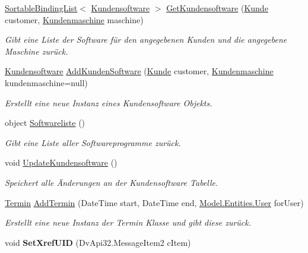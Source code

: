 \begin{DoxyCompactItemize}
\hyperlink{class_products_1_1_common_1_1_sortable_binding_list}{Sortable\+Binding\+List}$<$ \hyperlink{class_products_1_1_model_1_1_entities_1_1_kundensoftware}{Kundensoftware} $>$ \hyperlink{class_products_1_1_model_1_1_model_service_a25aa9ffb4a1196ceb47a65fe08ec54d2}{Get\+Kundensoftware} (\hyperlink{class_products_1_1_model_1_1_entities_1_1_kunde}{Kunde} customer, \hyperlink{class_products_1_1_model_1_1_entities_1_1_kundenmaschine}{Kundenmaschine} maschine)
\begin{DoxyCompactList}\small\item\em Gibt eine Liste der Software für den angegebenen Kunden und die angegebene Maschine zurück. \end{DoxyCompactList}\item 
\hyperlink{class_products_1_1_model_1_1_entities_1_1_kundensoftware}{Kundensoftware} \hyperlink{class_products_1_1_model_1_1_model_service_aecc875dd0da85f7a63bbb60f2fa423a5}{Add\+Kunden\+Software} (\hyperlink{class_products_1_1_model_1_1_entities_1_1_kunde}{Kunde} customer, \hyperlink{class_products_1_1_model_1_1_entities_1_1_kundenmaschine}{Kundenmaschine} kundenmaschine=null)
\begin{DoxyCompactList}\small\item\em Erstellt eine neue Instanz eines Kundensoftware Objekts. \end{DoxyCompactList}\item 
object \hyperlink{class_products_1_1_model_1_1_model_service_af8a203d7b4f6f8203d881e2a389e68f1}{Softwareliste} ()
\begin{DoxyCompactList}\small\item\em Gibt eine Liste aller Softwareprogramme zurück. \end{DoxyCompactList}\item 
void \hyperlink{class_products_1_1_model_1_1_model_service_a13852f2d31959e3b2d71fb00db01a3a7}{Update\+Kundensoftware} ()
\begin{DoxyCompactList}\small\item\em Speichert alle Änderungen an der Kundensoftware Tabelle. \end{DoxyCompactList}\item 
\hyperlink{class_products_1_1_model_1_1_entities_1_1_termin}{Termin} \hyperlink{class_products_1_1_model_1_1_model_service_ad0e7d421f3e8f6d70bc4d53657be478d}{Add\+Termin} (Date\+Time start, Date\+Time end, \hyperlink{class_products_1_1_model_1_1_entities_1_1_user}{Model.\+Entities.\+User} for\+User)
\begin{DoxyCompactList}\small\item\em Erstellt eine neue Instanz der Termin Klasse und gibt diese zurück. \end{DoxyCompactList}\item 
void {\bfseries Set\+Xref\+U\+ID} (Dv\+Api32.\+Message\+Item2 c\+Item)\hypertarget{class_products_1_1_model_1_1_model_service_a9612cd007116a36043df2ffaa3a57f08}{}\label{class_products_1_1_model_1_1_model_service_a9612cd007116a36043df2ffaa3a57f08}


\end{DoxyCompactItemize}
